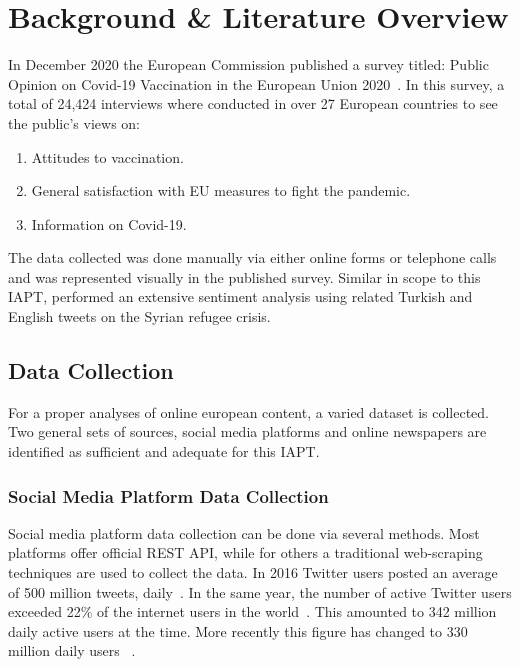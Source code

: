 \chapter{Background \& Literature Overview}

In December 2020 the European Commission published a survey titled: Public Opinion on Covid-19 Vaccination in the European Union 2020~\citep{eupublicopinion}.
In this survey, a total of 24,424 interviews where conducted in over 27 European countries to see the public's views on:

\begin{enumerate}
  \item Attitudes to vaccination.
  \item General satisfaction with EU measures to fight the pandemic.
  \item Information on Covid-19.
\end{enumerate}
\noindent The data collected was done manually via either online forms or telephone calls and was represented visually in the published survey.
Similar in scope to this \ac{IAPT}, \citet{ztrk2018} performed an extensive sentiment analysis using related Turkish and English tweets on the Syrian refugee crisis.

\section{Data Collection}

For a proper analyses of online european content, a varied dataset is collected.
Two general sets of sources, social media platforms and online newspapers are identified as sufficient and adequate for this \ac{IAPT}.

\subsection{Social Media Platform Data Collection}

Social media platform data collection can be done via several methods.
Most platforms offer official \ac{REST} \ac{API}, while for others a traditional web-scraping techniques are used to collect the data.
In 2016 Twitter users posted an average of 500 million tweets, daily~\citep{Crannell2016}.
In the same year, the number of active Twitter users exceeded 22\% of the internet users in the world~\citep{Kayser2016}.
This amounted to 342 million daily active users at the time.
More recently this figure has changed to 330 million daily users ~\citep{tankovska_2021}.

